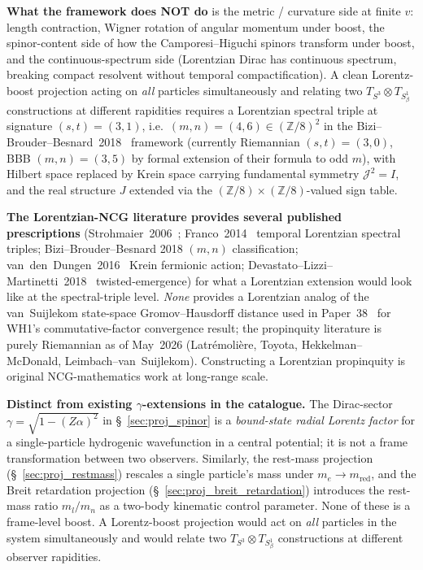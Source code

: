 \documentclass[11pt]{article}
\begin{document}
\begin{enumerate}
\textbf{What the framework does NOT do} is the metric / curvature
side at finite $v$: length contraction, Wigner rotation of angular
momentum under boost, the spinor-content side of how the
Camporesi--Higuchi spinors transform under boost, and the
continuous-spectrum side (Lorentzian Dirac has continuous spectrum,
breaking compact resolvent without temporal compactification).  A
clean Lorentz-boost projection acting on \emph{all} particles
simultaneously and relating two $T_{S^3} \otimes T_{S^1_\beta}$
constructions at different rapidities requires a Lorentzian
spectral triple at signature $(s, t) = (3, 1)$, i.e.\
$(m, n) = (4, 6) \in (\mathbb{Z}/8)^2$ in the
Bizi--Brouder--Besnard~2018~\cite{bizi_brouder_besnard2018}
framework (currently Riemannian $(s, t) = (3, 0)$, BBB $(m, n) = (3, 5)$
by formal extension of their formula to odd $m$),
with Hilbert space replaced by Krein
space carrying fundamental symmetry $\mathcal{J}^2 = I$, and the
real structure $J$ extended via the
$(\mathbb{Z}/8) \times (\mathbb{Z}/8)$-valued sign table.

\textbf{The Lorentzian-NCG literature provides several published
prescriptions} (Strohmaier~2006~\cite{strohmaier2006};
Franco~2014~\cite{franco_eckstein2014} temporal Lorentzian
spectral triples; Bizi--Brouder--Besnard 2018 $(m,n)$
classification; van~den~Dungen~2016~\cite{van_den_dungen2016} Krein
fermionic action; Devastato--Lizzi--Martinetti~2018~\cite{devastato_lizzi_martinetti2018}
twisted-emergence) for what a Lorentzian extension would look like
at the spectral-triple level.  \emph{None} provides a Lorentzian
analog of the van~Suijlekom state-space Gromov--Hausdorff distance
used in Paper~38~\cite{paper38} for WH1's commutative-factor convergence result; the propinquity
literature is purely Riemannian as of May~2026 (Latr\'emoli\`ere,
Toyota, Hekkelman--McDonald, Leimbach--van~Suijlekom).
Constructing a Lorentzian propinquity is original NCG-mathematics
work at long-range scale.

\textbf{Distinct from existing $\gamma$-extensions in the
catalogue.}  The Dirac-sector $\gamma = \sqrt{1 - (Z\alpha)^2}$ in
\S~\ref{sec:proj_spinor} is a \emph{bound-state radial Lorentz
factor} for a single-particle hydrogenic wavefunction in a central
potential; it is not a frame transformation between two observers.
Similarly, the rest-mass projection
(\S~\ref{sec:proj_restmass}) rescales a single particle's mass under
$m_e \to m_\text{red}$, and the Breit retardation projection
(\S~\ref{sec:proj_breit_retardation}) introduces the rest-mass
ratio $m_l/m_n$ as a two-body kinematic control parameter.  None of
these is a frame-level boost.  A Lorentz-boost projection would act
on \emph{all} particles in the system simultaneously and would
relate two $T_{S^3} \otimes T_{S^1_\beta}$ constructions at
different observer rapidities.


\end{enumerate}
\end{document}
